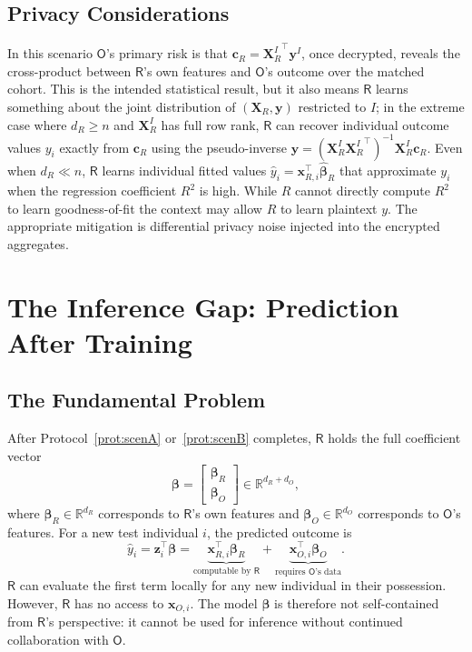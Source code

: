 \documentclass[12pt]{article}
\theoremstyle{definition}
\theoremstyle{plain}
\newcommand{\R}{\mathbb{R}}
\newcommand{\bXR}{\mathbf{X}_{R}}
\newcommand{\bXRI}{\mathbf{X}_{R}^{I}}
\newcommand{\by}{\mathbf{y}}
\newcommand{\bbeta}{\boldsymbol{\beta}}
\newcommand{\bcR}{\mathbf{c}_{R}}
\newcommand{\Party}[1]{\textsf{#1}}
\begin{document}
\subsection{Privacy Considerations}

In this scenario $\Party{O}$'s primary risk is that $\bcR = {\bXRI}^{\top}\by^{I}$, once decrypted, reveals the cross-product between $\Party{R}$'s own features and $\Party{O}$'s outcome over the matched cohort. This is the intended statistical result, but it also means $\Party{R}$ learns something about the joint distribution of $(\bXR, \by)$ restricted to $I$; in the extreme case where $d_{R} \geq n$ and $\bXRI$ has full row rank, $\Party{R}$ can recover individual outcome values $y_{i}$ exactly from $\bcR$ using the pseudo-inverse $\by = ({\bXRI}{\bXRI}^{\top})^{-1}{\bXRI}\bcR$. Even when $d_{R} \ll n$, $\Party{R}$ learns individual fitted values $\hat{y}_{i} = \mathbf{x}_{R,i}^{\top}\hat{\bbeta}_{R}$ that approximate $y_{i}$ when the regression coefficient $R^{2}$ is high. While $R$ cannot directly compute $R^2$ to learn goodness-of-fit the context may allow $R$ to learn plaintext $y$.
The appropriate mitigation is differential privacy noise injected into the encrypted aggregates. 

\section{The Inference Gap: Prediction After Training}
\label{sec:inference}

\subsection{The Fundamental Problem}

After Protocol~\ref{prot:scenA} or~\ref{prot:scenB} completes, $\Party{R}$ holds the full coefficient vector
\begin{equation}
  \bbeta = \begin{bmatrix} \bbeta_{R} \\ \bbeta_{O} \end{bmatrix} \in \R^{d_{R}+d_{O}},
\end{equation}
where $\bbeta_{R} \in \R^{d_{R}}$ corresponds to $\Party{R}$'s own features and $\bbeta_{O} \in \R^{d_{O}}$ corresponds to $\Party{O}$'s features. For a new test individual $i$, the predicted outcome is
\begin{equation}
  \hat{y}_{i} = \mathbf{z}_{i}^{\top}\bbeta
              = \underbrace{\mathbf{x}_{R,i}^{\top}\bbeta_{R}}_{\text{computable by }\Party{R}}
              + \underbrace{\mathbf{x}_{O,i}^{\top}\bbeta_{O}}_{\text{requires }\Party{O}\text{'s data}}.
\end{equation}
$\Party{R}$ can evaluate the first term locally for any new individual in their possession. However, $\Party{R}$ has no access to $\mathbf{x}_{O,i}$. The model $\bbeta$ is therefore not self-contained from $\Party{R}$'s perspective: it cannot be used for inference without continued collaboration with $\Party{O}$.
\end{document}
